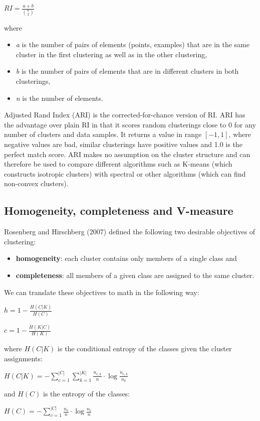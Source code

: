 \documentclass[conference]{IEEEtran}
\begin{document}
$RI = \frac{a+b}{{n \choose 2}}$

where
\begin{itemize}
    \item \textit{a} is the number of pairs of elements (points, examples) that are in the same cluster in the first clustering
    as well as in the other clustering,
    \item \textit{b} is the number of pairs of elements that are in different clusters in both clusterings,
    \item \textit{n} is the number of elements.
\end{itemize}

Adjusted Rand Index (ARI) is the corrected-for-chance version of RI.
ARI has the advantage over plain RI in that it scores random 
clusterings close to 0 for any number of clusters and data samples. It returns
a value in range $[-1, 1]$, where negative values are bad, similar clusterings have
positive values and 1.0 is the perfect match score. ARI makes no assumption on the cluster
structure and can therefore be used to compare different algorithms such as K-means (which
constructs isotropic clusters) with spectral or other algorithms (which can find non-convex
clusters).

\subsection{Homogeneity, completeness and V-measure}
Rosenberg and Hirschberg (2007) defined the following two desirable objectives of clustering:
\begin{itemize}
    \item \textbf{homogeneity}: each cluster contains only members of a single class and
    \item \textbf{completeness}: all members of a given class are assigned to the same cluster.
\end{itemize}
We can translate these objectives to math in the following way:

$h = 1 - \frac{H(C|K)}{H(C)}$

$c = 1 - \frac{H(K|C)}{H(K)}$

where $H(C|K)$ is the conditional entropy of the classes given the cluster assignments:

$H(C|K) = - \sum\limits_{c=1}^{|C|}\sum\limits_{k=1}^{|K|}\frac{n_{c,k}}{n}\cdot \log{\frac{n_{c,k}}{n_k}}$

and $H(C)$ is the entropy of the classes:

$H(C) = - \sum\limits_{c=1}^{|C|}\frac{n_c}{n} \cdot \log{\frac{n_c}{n}}$
\end{document}
